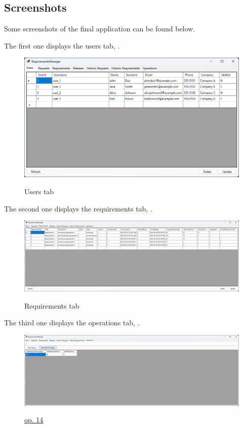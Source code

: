 \documentclass[12pt, a4paper]{report}
\begin{document}
\subsection*{Screenshots}

Some screenshots of the final application can be found below.

The first one displays the users tab, .

\begin{figure}[H]
\centering
\caption{Users tab}
\includegraphics[width=\textwidth]{app-users}
\label{fig:app_users}
\end{figure}

The second one displays the requirements tab, .

\begin{figure}[H]
\centering
\caption{Requirements tab}
\includegraphics[width=\textwidth]{app-requirements}
\label{fig:app_requirements}
\end{figure}

The third one displays the operations tab, .

\begin{figure}[H]
\centering
\caption{\hyperref[subsubsec:op14]{op. 14}}
\includegraphics[width=\textwidth]{app-op14}
\label{fig:app_op14}
\end{figure}
\end{document}

